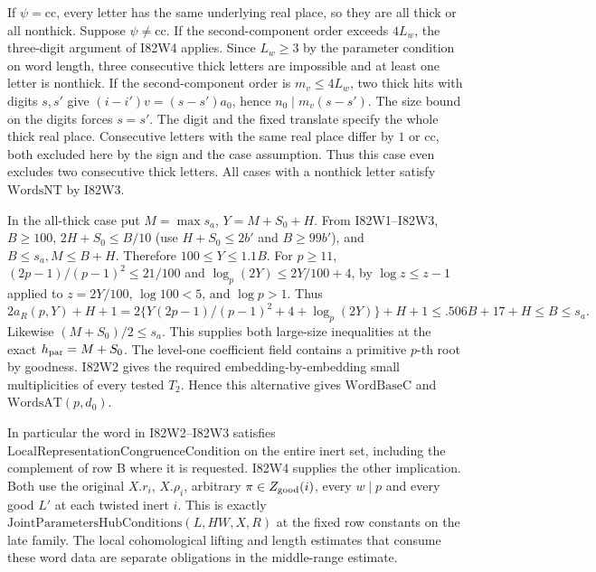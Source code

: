 If $\psi=\mathrm{cc}$, every letter has the same underlying real
place, so they are all thick or all nonthick. Suppose
$\psi\ne\mathrm{cc}$. If the second-component order exceeds
$4L_w$, the three-digit argument of I82W4 applies. Since $L_w\ge3$
by the parameter condition on word length, three consecutive thick
letters are impossible and at least one letter is nonthick. If
the second-component order is $m_v\le4L_w$, two thick hits with
digits $s,s'$ give $(i-i')v=(s-s')a_0$, hence
$n_0\mid m_v(s-s')$. The size bound on the digits forces $s=s'$.
The digit and the fixed translate specify the whole thick real
place. Consecutive letters with the same real place differ by
$1$ or $\mathrm{cc}$, both excluded here by the sign and the
case assumption. Thus this case even excludes two consecutive
thick letters. All cases with a nonthick letter satisfy
$\mathrm{WordsNT}$ by I82W3.

In the all-thick case put $M=\max s_a$, $Y=M+S_0+H$.
From I82W1--I82W3,
$B\ge100$, $2H+S_0\le B/10$ (use $H+S_0\le2b'$ and $B\ge99b'$),
and $B\le s_a,M\le B+H$. Therefore $100\le Y\le1.1B$.
For $p\ge11$, $(2p-1)/(p-1)^2\le21/100$ and
$\log_p(2Y)\le 2Y/100+4$, by $\log z\le z-1$ applied to
$z=2Y/100$, $\log 100<5$, and $\log p>1$. Thus
\[
 2a_R(p,Y)+H+1
 =2\{Y(2p-1)/(p-1)^2+4+\log_p(2Y)\}+H+1
 \le .506B+17+H\le B\le s_a .
\]
Likewise $(M+S_0)/2\le s_a$. This supplies both large-size
inequalities at the exact $h_{\rm par}=M+S_0$. The level-one
coefficient field contains a primitive $p$-th root by goodness.
I82W2 gives the required embedding-by-embedding small multiplicities
of every tested $T_2$. Hence this alternative gives
$\mathrm{WordBaseC}$ and $\mathrm{WordsAT}(p,d_0)$.

In particular the word in I82W2--I82W3 satisfies
$\mathrm{LocalRepresentationCongruenceCondition}$ on the entire
inert set, including the complement of row B where it is requested.
I82W4 supplies the other implication. Both use the original $X.r_i$,
$X.\rho_i$, arbitrary $\pi\in Z_{\rm good}(i)$, every $w\mid p$
and every good $L'$ at each twisted inert $i$. This is exactly
$\mathrm{JointParametersHubConditions}(L,HW,X,R)$ at the fixed
row constants on the late family. The local cohomological lifting
and length estimates that consume these word data are separate
obligations in the middle-range estimate.
